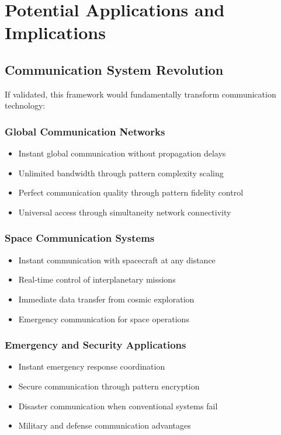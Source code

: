 \documentclass[12pt,a4paper]{article}
\begin{document}
\section{Potential Applications and Implications}

\subsection{Communication System Revolution}

If validated, this framework would fundamentally transform communication technology:

\subsubsection{Global Communication Networks}
\begin{itemize}
\item Instant global communication without propagation delays
\item Unlimited bandwidth through pattern complexity scaling
\item Perfect communication quality through pattern fidelity control
\item Universal access through simultaneity network connectivity
\end{itemize}

\subsubsection{Space Communication Systems}
\begin{itemize}
\item Instant communication with spacecraft at any distance
\item Real-time control of interplanetary missions
\item Immediate data transfer from cosmic exploration
\item Emergency communication for space operations
\end{itemize}

\subsubsection{Emergency and Security Applications}
\begin{itemize}
\item Instant emergency response coordination
\item Secure communication through pattern encryption
\item Disaster communication when conventional systems fail
\item Military and defense communication advantages
\end{itemize}
\end{document}
